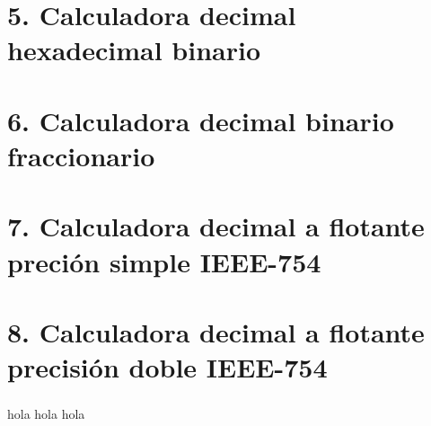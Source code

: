 \documentclass[
	spanish,
	8pt,
	utf8,
	xcolor=table,
	handout,
	aspectratio=169,
	professionalfonts,
	mathserif,
	leqno,
]{beamer}
\begin{document}
\section{5. Calculadora decimal hexadecimal binario}

\begin{frame}
	\frametitle{\secname}
\end{frame}

\section{6. Calculadora decimal binario fraccionario}

\begin{frame}
	\frametitle{\secname}
\end{frame}

\section{7. Calculadora decimal a flotante preción simple IEEE-754}

\begin{frame}
	\frametitle{\secname}
\end{frame}

\section{8. Calculadora decimal a flotante precisión doble IEEE-754}

\begin{frame}
	\frametitle{\secname}
\end{frame}

\begin{frame}

	\begin{solution}
		\begin{minipage}{0.55\textwidth}
		\end{minipage}
		\begin{minipage}{0.35\textwidth}
			hola hola hola
		\end{minipage}
	\end{solution}
\end{frame}
\end{document}

